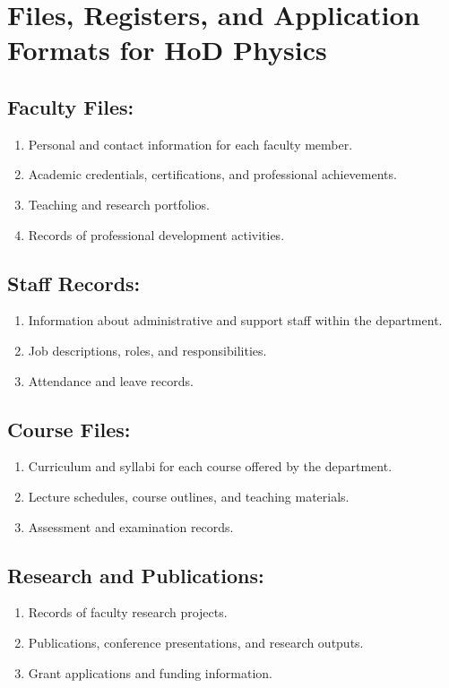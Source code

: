 \documentclass[a4paper, 12pt]{article}
\title{}
\author{}
\begin{document}
\maketitle


\section*{Files, Registers, and Application Formats for HoD Physics}

\subsection*{Faculty Files:}
\begin{enumerate}
  \item Personal and contact information for each faculty member.
  \item Academic credentials, certifications, and professional achievements.
  \item Teaching and research portfolios.
  \item Records of professional development activities.
\end{enumerate}

\subsection*{Staff Records:}
\begin{enumerate}
  \item Information about administrative and support staff within the department.
  \item Job descriptions, roles, and responsibilities.
  \item Attendance and leave records.
\end{enumerate}

\subsection*{Course Files:}
\begin{enumerate}
  \item Curriculum and syllabi for each course offered by the department.
  \item Lecture schedules, course outlines, and teaching materials.
  \item Assessment and examination records.
\end{enumerate}

\subsection*{Research and Publications:}
\begin{enumerate}
  \item Records of faculty research projects.
  \item Publications, conference presentations, and research outputs.
  \item Grant applications and funding information.
\end{enumerate}
\end{document}
